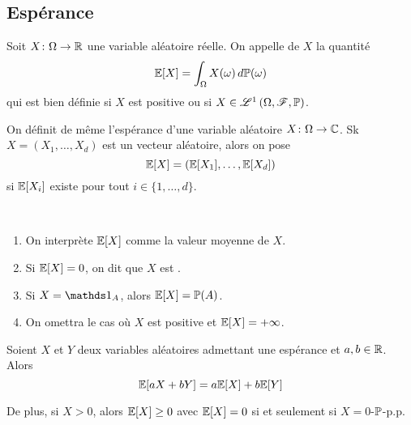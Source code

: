 \subsection{Espérance} %

\begin{definition}
    Soit \(X\colon\Omega\to\mathbb{R}\) une variable aléatoire réelle.
    On appelle  de \( X\) la quantité
    \begin{equation*}
        \mathbb{E}\mathopen{}\left[X\right]\mathclose{} = \int_{\Omega} X(\omega) \mathop{}\!{d}\mathbb{P}(\omega)
    \end{equation*}
    qui est bien définie si \(X\) est positive ou si 
    \(X\in\mathscr{L}^1\left(\Omega, \mathscr{F}, \mathbb{P}\right)\).

    On définit de même l'espérance d'une variable aléatoire
    \(X\colon\Omega\to\mathbb{C}\). Sk \(X=\left(X_1,\ldots,X_d\right)\)
    est un vecteur aléatoire, alors on pose
    \begin{equation*}
        \mathbb{E}\mathopen{}\left[X\right]\mathclose{} = \left(\mathbb{E}\mathopen{}\left[X_1\right]\mathclose{},\ldots,\mathbb{E}\mathopen{}\left[X_d\right]\mathclose{}\right)
    \end{equation*}
    si \(\mathbb{E}\mathopen{}\left[X_i\right]\mathclose{}\) existe pour tout \(i\in\{1,\ldots,d\}\).
\end{definition}

\begin{remark}\,
    \begin{enumerate}
        \item On interprète \(\mathbb{E}\mathopen{}\left[X\right]\mathclose{}\) comme la valeur moyenne de \(X\).

        \item Si \(\mathbb{E}\mathopen{}\left[X\right]\mathclose{} = 0\), on dit que \(X\) est .

        \item Si \(X = \one_A\), alors \(\mathbb{E}\mathopen{}\left[X\right]\mathclose{} = \mathbb{P}(A)\).

        \item On omettra le cas où \(X\) est positive et \(\mathbb{E}\mathopen{}\left[X\right]\mathclose{} = +\infty\).
    \end{enumerate}
\end{remark}

\begin{proposition}
    Soient \(X\) et \(Y\) deux variables aléatoires admettant une espérance
    et \(a,b\in\mathbb{R}\). Alors
    \begin{equation*}
        \mathbb{E}\mathopen{}\left[aX + bY\right]\mathclose{} = a\mathbb{E}\mathopen{}\left[X\right]\mathclose{} + b\mathbb{E}\mathopen{}\left[Y\right]\mathclose{}
    \end{equation*}

    De plus, si \(X>0\), alors \(\mathbb{E}\mathopen{}\left[X\right]\mathclose{}\geq 0\) avec
    \(\mathbb{E}\mathopen{}\left[X\right]\mathclose{} = 0\) si et seulement si \(X=0\)-\(\mathbb{P}\)-p.p.
\end{proposition}

